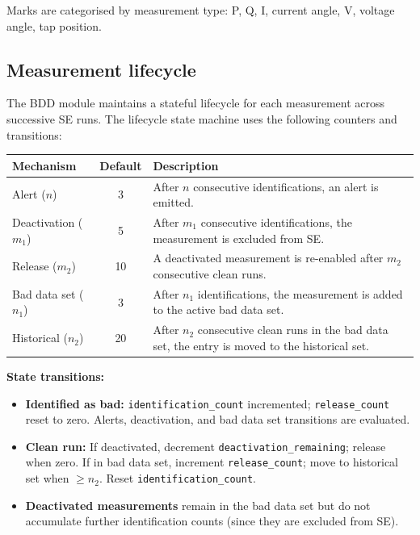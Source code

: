 \documentclass[11pt,a4paper]{article}
\begin{document}
Marks are categorised by measurement type: P, Q, I, current angle, V,
voltage angle, tap position.

\subsection{Measurement lifecycle}\label{sec:lifecycle}

The BDD module maintains a stateful lifecycle for each measurement across
successive SE runs.  The lifecycle state machine uses the following
counters and transitions:

\begin{center}
\small
\begin{tabular}{lcp{55mm}}
  \toprule
  \textbf{Mechanism} & \textbf{Default} & \textbf{Description} \\
  \midrule
  Alert ($n$)          & 3   & After $n$ consecutive identifications, an alert
    is emitted. \\
  Deactivation ($m_1$) & 5   & After $m_1$ consecutive identifications, the
    measurement is excluded from SE. \\
  Release ($m_2$)      & 10  & A deactivated measurement is re-enabled after
    $m_2$ consecutive clean runs. \\
  Bad data set ($n_1$) & 3   & After $n_1$ identifications, the measurement
    is added to the active bad data set. \\
  Historical ($n_2$)   & 20  & After $n_2$ consecutive clean runs in the
    bad data set, the entry is moved to the historical set. \\
  \bottomrule
\end{tabular}
\end{center}

\textbf{State transitions:}

\begin{itemize}
  \item \textbf{Identified as bad:} \texttt{identification\_count}
        incremented; \texttt{release\_count} reset to zero.  Alerts,
        deactivation, and bad data set transitions are evaluated.
  \item \textbf{Clean run:} If deactivated, decrement
        \texttt{deactivation\_remaining}; release when zero.  If in bad
        data set, increment \texttt{release\_count}; move to historical
        set when $\ge n_2$.  Reset \texttt{identification\_count}.
  \item \textbf{Deactivated measurements} remain in the bad data set but
        do not accumulate further identification counts (since they are
        excluded from SE).
\end{itemize}
\end{document}

